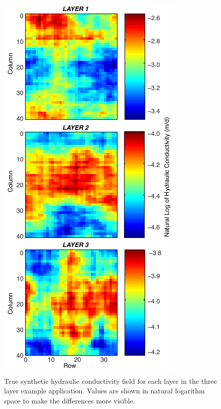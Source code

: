 \documentclass[11pt,oneside,onecolumn]{usgsreport}
\begin{document}
\begin{appendix}
\begin{figure}[H]
\begin{center}\includegraphics{figures/3_layer_TRUE_K_field}\end{center}

\caption{\label{3Ltruek}True synthetic hydraulic conductivity field for each
layer in the three layer example application. Values are shown in
natural logarithm space to make the differences more visible.}


\end{figure}



\end{appendix}
\end{document}
